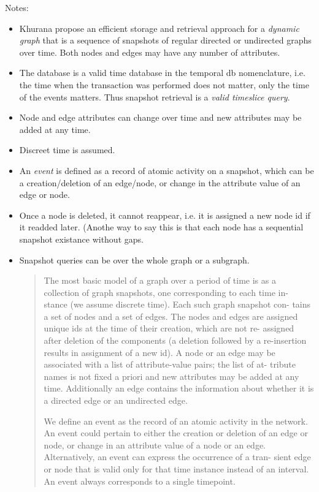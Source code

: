 \documentclass[10pt]{article}
\begin{document}
Notes:
\begin{itemize}

\item Khurana propose an efficient storage and retrieval approach for a {\em dynamic graph} that is a sequence of snapshots of regular directed or undirected graphs over time. Both nodes and edges may have any number of attributes.
\item The database is a valid time database in the temporal db nomenclature, i.e. the time when the transaction was performed does not matter, only the time of the events matters. Thus snapshot retrieval is a {\em valid timeslice query}.
\item Node and edge attributes can change over time and new attributes may be added at any time.
\item Discreet time is assumed.
\item An {\em event} is defined as a record of atomic activity on a snapshot, which can be a creation/deletion of an edge/node, or change in the attribute value of an edge or node.
\item Once a node is deleted, it cannot reappear, i.e. it is assigned a new node id if it readded later. (Anothe way to say this is that each node has a sequential snapshot existance without gaps.
\item Snapshot queries can be over the whole graph or a subgraph.

\begin{quote}

The most basic model of a graph over a period of time is as a collection of graph snapshots, one corresponding to each time in- stance (we assume discrete time). Each such graph snapshot con- tains a set of nodes and a set of edges. The nodes and edges are assigned unique ids at the time of their creation, which are not re- assigned after deletion of the components (a deletion followed by a re-insertion results in assignment of a new id). A node or an edge may be associated with a list of attribute-value pairs; the list of at- tribute names is not fixed a priori and new attributes may be added at any time. Additionally an edge contains the information about whether it is a directed edge or an undirected edge.

We define an event as the record of an atomic activity in the network. An event could pertain to either the creation or deletion of an edge or node, or change in an attribute value of a node or an edge. Alternatively, an event can express the occurrence of a tran- sient edge or node that is valid only for that time instance instead of an interval. An event always corresponds to a single timepoint.


\end{quote}
\end{itemize}
\end{document}
